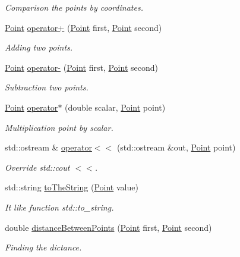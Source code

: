 \begin{DoxyCompactItemize}
\begin{DoxyCompactList}\small\item\em Comparison the points by coordinates. \end{DoxyCompactList}\item 
\mbox{\hyperlink{structtdp_1_1_point}{Point}} \mbox{\hyperlink{namespacetdp_a34cf3e1ef508e6a115b6c1d24a5dbb5d}{operator+}} (\mbox{\hyperlink{structtdp_1_1_point}{Point}} first, \mbox{\hyperlink{structtdp_1_1_point}{Point}} second)
\begin{DoxyCompactList}\small\item\em Adding two points. \end{DoxyCompactList}\item 
\mbox{\hyperlink{structtdp_1_1_point}{Point}} \mbox{\hyperlink{namespacetdp_ab8dc4a4b6272d3a8ef06f22a5b07daec}{operator-\/}} (\mbox{\hyperlink{structtdp_1_1_point}{Point}} first, \mbox{\hyperlink{structtdp_1_1_point}{Point}} second)
\begin{DoxyCompactList}\small\item\em Subtraction two points. \end{DoxyCompactList}\item 
\mbox{\hyperlink{structtdp_1_1_point}{Point}} \mbox{\hyperlink{namespacetdp_a291c69f1bd3cf68f5c2b68fc3ab37f3a}{operator$\ast$}} (double scalar, \mbox{\hyperlink{structtdp_1_1_point}{Point}} point)
\begin{DoxyCompactList}\small\item\em Multiplication point by scalar. \end{DoxyCompactList}\item 
std\+::ostream \& \mbox{\hyperlink{namespacetdp_a40a6deb04f2cc708b0cd33955e23ffb6}{operator$<$$<$}} (std\+::ostream \&out, \mbox{\hyperlink{structtdp_1_1_point}{Point}} point)
\begin{DoxyCompactList}\small\item\em Override std\+::cout $<$$<$. \end{DoxyCompactList}\item 
std\+::string \mbox{\hyperlink{namespacetdp_ade7149690123950b10455ece39159e94}{to\+The\+String}} (\mbox{\hyperlink{structtdp_1_1_point}{Point}} value)
\begin{DoxyCompactList}\small\item\em It like function std\+::to\+\_\+string. \end{DoxyCompactList}\item 
double \mbox{\hyperlink{namespacetdp_a05b1894339c9a02c1e9347d3dd6fd07a}{distance\+Between\+Points}} (\mbox{\hyperlink{structtdp_1_1_point}{Point}} first, \mbox{\hyperlink{structtdp_1_1_point}{Point}} second)
\begin{DoxyCompactList}\small\item\em Finding the dictance. \end{DoxyCompactList}\end{DoxyCompactItemize}


